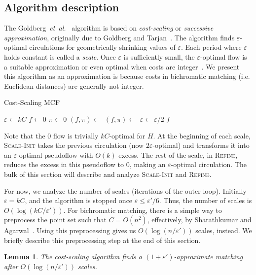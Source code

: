 \documentclass[11pt]{article}
\def\etal{\textsl{et~al.}}
\def\eps{\varepsilon}
\theoremstyle{plain}
\newtheorem{lemma}{Lemma}
\begin{document}
\subsection{Algorithm description}

The Goldberg~{\etal}~\cite{GHKT17} algorithm is based on \emph{cost-scaling} or 
\emph{successive approximation}, originally due to Goldberg and 
Tarjan~\cite{GT90}.
The algorithm finds $\eps$-optimal circulations for geometrically shrinking 
values of $\eps$. 
Each period where $\eps$ holds constant is called a \emph{scale}.
Once $\eps$ is sufficiently small, the $\eps$-optimal flow is a suitable 
approximation or even optimal when costs are integer~\cite{GT90,GHKT17}.
We present this algorithm as an approximation is because costs in bichromatic 
matching (i.e. Euclidean distances) are generally not integer.

\begin{algorithm}
\caption{Cost-Scaling MCF}
\begin{algorithmic}[1]
\Function{MCF}{$H$, $\eps'$}
	\State $\eps \gets kC$
	\State $f \gets 0$
	\State $\pi \gets 0$
	\Repeat
		\State $(f, \pi) \gets$ 
		\State $(f, \pi) \gets$ 
		\State $\eps \gets \eps/2$
	\Until{$\eps \leq \eps'/6$}
	\State\Return $f$
\EndFunction
\end{algorithmic}
\end{algorithm}

Note that the 0 flow is trivially $kC$-optimal for $H$.
At the beginning of each scale, \textsc{Scale-Init} takes the previous 
circulation (now $2\eps$-optimal) and transforms it into an $\eps$-optimal 
pseudoflow with $O(k)$ excess.
The rest of the scale, in \textsc{Refine}, reduces the excess in this 
pseudoflow to 0, making an $\eps$-optimal circulation.
The bulk of this section will describe and analyze \textsc{Scale-Init} and 
\textsc{Refine}.

For now, we analyze the number of scales (iterations of the outer loop).
Initially $\eps = kC$, and the algorithm is stopped once $\eps \leq \eps'/6$.
Thus, the number of scales is $O(\log(kC/\eps'))$.
For bichromatic matching, there is a simple way to preprocess the point set 
such that $C = O(n^2)$, effectively, by Sharathkumar and Agarwal~\cite{SA12}.
Using this preprocessing gives us $O(\log(n/\eps'))$ scales, instead.
We briefly describe this preprocessing step at the end of this section.

\begin{lemma}
\label{lemma:goldberg_scales}
	The cost-scaling algorithm finds a $(1 + \eps')$-approximate matching
	after $O(\log(n/\eps'))$ scales.
\end{lemma}
\end{document}
